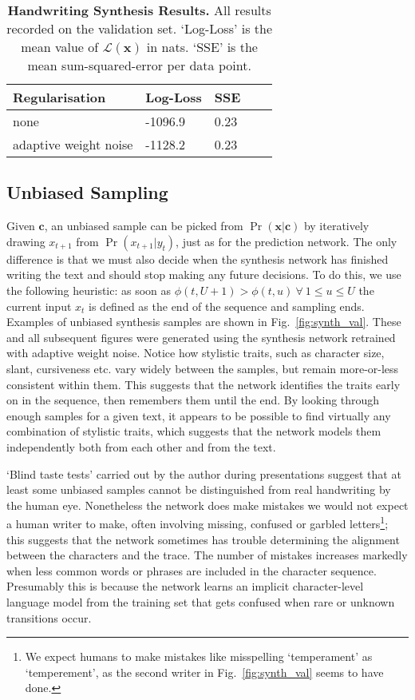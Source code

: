 \documentclass{article}
\newcommand{\tlabel}[1]{\label{tab:#1}}
\newcommand{\fref}[1]{Fig.~\ref{fig:#1}}
\newcommand{\seq}[1]{\mathbf{#1}}
\newcommand{\invble}{x}
\newcommand{\inseq}{\seq{\invble}}
\newcommand{\ann}{\seq{c}}
\newcommand{\loss}{\mathcal{L}(\inseq)}
\newcommand{\capt}[2]{\caption[#1]{\textbf{#1}#2}}
\begin{document}
\begin{table}
\centering
\capt{Handwriting Synthesis Results.}{ All results recorded on the validation set. `Log-Loss' is the mean value of $\loss$ in nats. `SSE' is the mean sum-squared-error per data point.}
\tlabel{hand_synth}
\vskip 0.15in
\begin{center}
\begin{sc}
\begin{tabular}{lllll}
\hline
Regularisation &Log-Loss & SSE\\
\hline
none & -1096.9  & 0.23\\
adaptive weight noise & -1128.2 & 0.23\\
\hline
\end{tabular}
\end{sc}
\end{center}
\vskip -0.1in
\end{table}



\subsection{Unbiased Sampling}
Given $\ann$, an unbiased sample can be picked from $\Pr(\inseq|\ann)$ by iteratively drawing $x_{t+1}$ from $\Pr\left(x_{t+1}|y_t\right)$, just as for the prediction network.
The only difference is that we must also decide when the synthesis network has finished writing the text and should stop making any future decisions.
To do this, we use the following heuristic: as soon as $\phi(t, U+1) > \phi(t, u)\ \forall\ 1 \leq u \leq U$ the current input $x_t$ is defined as the end of the sequence and sampling ends.
Examples of unbiased synthesis samples are shown in \fref{synth_val}.
These and all subsequent figures were generated using the synthesis network retrained with adaptive weight noise. 
Notice how stylistic traits, such as character size, slant, cursiveness etc. vary widely between the samples, but remain more-or-less consistent within them.
This suggests that the network identifies the traits early on in the sequence, then remembers them until the end.
By looking through enough samples for a given text, it appears to be possible to find virtually any combination of stylistic traits, which suggests that the network models them independently both from each other and from the text.

`Blind taste tests' carried out by the author during presentations suggest that at least some unbiased samples cannot be distinguished from real handwriting by the human eye. 
Nonetheless the network does make mistakes we would not expect a human writer to make, often involving missing, confused or garbled letters\footnote{We expect humans to make mistakes like misspelling `temperament' as `temperement', as the second writer in \fref{synth_val} seems to have done.}; this suggests that the network sometimes has trouble determining the alignment between the characters and the trace.
The number of mistakes increases markedly when less common words or phrases are included in the character sequence.
Presumably this is because the network learns an implicit character-level language model from the training set that gets confused when rare or unknown transitions occur.
\end{document}

